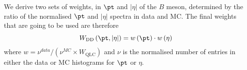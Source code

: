 We derive two sets of weights, in $\pt$ and $|\eta|$ of the $B$ meson,
determined by the ratio of the normalised $\pt$ and $|\eta|$ spectra
in data and MC.
The final weights that are going to be used are therefore
\begin{equation}
W_\mathrm {DD}\left(\pt,|\eta|\right)=w\left(\pt\right)\cdot w\left(\eta\right)\label{for:ddw}
\end{equation}
where $w={\nu^{data}}/({\nu^{MC}}\times W_\mathrm {QLC})$ and $\nu$ is the normalised
number of entries in either the data or MC histograms for $\pt$ or $\eta$.








\clearpage
